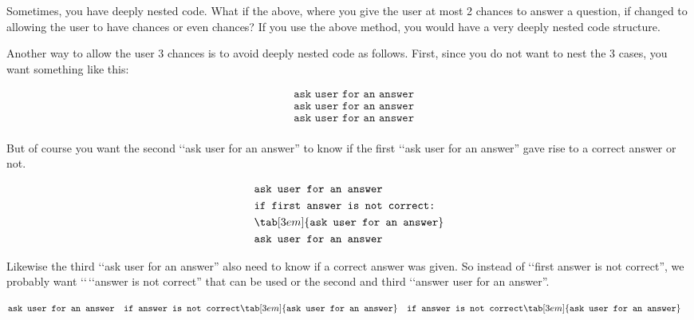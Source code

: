 Sometimes, you have deeply nested code. What if the above, where you
give the user at most 2 chances to answer a question, if changed to
allowing the user to have  chances or even  chances?
If you use the above method, you would have a very deeply nested code
structure.

Another way to allow the user 3 chances is to avoid deeply nested code
as follows. First, since you do not want to nest the 3 cases, you want
something like this:

\begin{align*}
&\texttt{ask user for an answer}\\
&\texttt{ask user for an answer}\\
&\texttt{ask user for an answer}\\
\end{align*}

But of course you want the second \lq\lq ask user for an answer'' to know if
the first \lq\lq ask user for an answer'' gave rise to a correct answer or
not.

\begin{align*}
&\texttt{ask user for an answer}\\
&\texttt{if first answer is not correct:}\\
&\tab[3em]{\texttt{ask user for an answer}}\\
&\texttt{ask user for an answer}\\
\end{align*}

Likewise the third \lq\lq ask user for an answer'' also need to know if a
correct answer was given. So instead of \lq\lq first answer is not correct'',
we probably want \lq\lq \,\lq\lq answer is not correct'' that can be used or the second and third \lq\lq answer user for an answer''.

\begin{align*}
&\texttt{ask user for an answer}
&\texttt{if answer is not correct}
&\tab[3em]{\texttt{ask user for an answer}}
&\texttt{if answer is not correct}
&\tab[3em]{\texttt{ask user for an answer}}
\end{align*}

